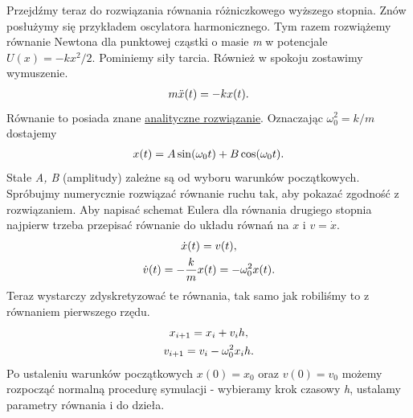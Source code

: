 \documentclass[a4paper,12pt,polish]{sphinxmanual}
\begin{document}
Przejdźmy teraz do rozwiązania równania różniczkowego wyższego stopnia. Znów posłużymy się przykładem
oscylatora harmonicznego. Tym razem rozwiążemy równanie Newtona dla punktowej cząstki o masie \emph{m}
w potencjale $U(x) = -k x^2 / 2$. Pominiemy siły tarcia. Również w spokoju zostawimy wymuszenie.
\begin{gather}
\begin{split}m \ddot{x}(t) = -kx(t).\end{split}\notag
\end{gather}
Równanie to posiada znane
\href{http://ribes.if.uj.edu.pl/homepage/weblog/Oscylator\_harmoniczny\_rozwiazanie/Oscylator\_harmoniczny\_rozwiazanie.pdf}{analityczne rozwiązanie}.
Oznaczając $\omega_0^2 = k/m$ dostajemy
\begin{gather}
\begin{split}x(t) = A \sin(\omega_0 t) + B \cos(\omega_0 t).\end{split}\notag
\end{gather}
Stałe \emph{A, B} (amplitudy) zależne są od wyboru warunków początkowych. Spróbujmy numerycznie
rozwiązać równanie ruchu tak, aby pokazać zgodność z rozwiązaniem. Aby napisać schemat Eulera dla równania
drugiego stopnia najpierw trzeba przepisać równanie do układu równań na $x$ i $v = \dot{x}$.
\begin{gather}
\begin{split}\dot{x}(t) = v(t),\end{split}\notag\\\begin{split}\dot{v}(t) = -\frac{k}{m} x(t) = - \omega_0^2 x(t).\end{split}\notag
\end{gather}
Teraz wystarczy zdyskretyzować te równania, tak samo jak robiliśmy to z równaniem pierwszego rzędu.
\begin{gather}
\begin{split}x_{i+1} = x_i + v_i h,\end{split}\notag\\\begin{split}v_{i+1} = v_i - \omega^2_0 x_i h.\end{split}\notag
\end{gather}
Po ustaleniu warunków początkowych $x(0) = x_0$ oraz $v(0) = v_0$ możemy rozpocząć normalną
procedurę symulacji - wybieramy krok czasowy \emph{h}, ustalamy parametry równania i do dzieła.
\end{document}
